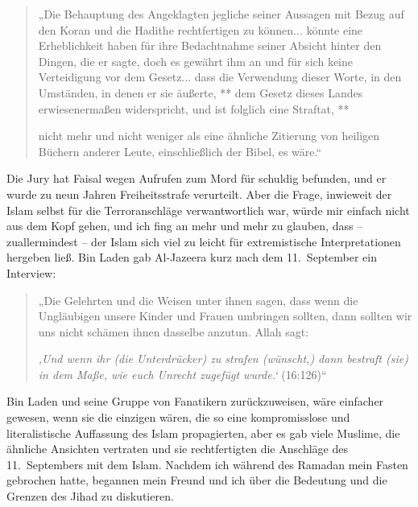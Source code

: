 \documentclass[12pt]{memoir}
\newcommand{\QRef}[1]{{\color{darkblue}#1}}
\begin{document}
\begin{quote}
„Die Behauptung des Angeklagten
jegliche seiner Aussagen mit Bezug auf den Koran
und die Hadithe rechtfertigen zu können...
könnte eine Erheblichkeit haben für ihre Bedachtnahme
seiner Absicht hinter den Dingen, die er sagte,
doch es gewährt ihm an und für sich keine Verteidigung vor dem Gesetz...
dass die Verwendung dieser Worte,
in den Umständen, in denen er sie äußerte,
**
dem Gesetz dieses Landes erwiesenermaßen widerspricht,
und ist folglich eine Straftat,
**

nicht mehr und nicht weniger als eine ähnliche Zitierung
von heiligen Büchern anderer Leute, einschließlich der Bibel, es wäre.“
\end{quote}

Die Jury hat Faisal wegen Aufrufen zum Mord für schuldig befunden,
und er wurde zu neun Jahren Freiheitsstrafe verurteilt.
Aber die Frage, inwieweit der Islam selbst
für die Terroranschläge verwantwortlich war,
würde mir einfach nicht aus dem Kopf gehen,
und ich fing an mehr und mehr zu glauben,
dass – zuallermindest – der Islam sich viel zu leicht
für extremistische Interpretationen hergeben ließ.
Bin Laden gab Al-Jazeera kurz nach dem 11.\ September ein Interview:

\begin{quote}
„Die Gelehrten und die Weisen unter ihnen sagen,
dass wenn die Ungläubigen unsere Kinder und Frauen umbringen sollten,
dann sollten wir uns nicht schämen ihnen dasselbe anzutun.
Allah sagt:

\emph{‚Und wenn ihr (die Unterdrücker) zu strafen (wünscht,)
dann bestraft (sie) in dem Maße, wie euch Unrecht zugefügt wurde.‘}
(\QRef{16:126})“
\end{quote}

Bin Laden und seine Gruppe von Fanatikern zurückzuweisen,
wäre einfacher gewesen, wenn sie die einzigen wären,
die so eine kompromisslose und literalistische Auffassung
des Islam propagierten,
aber es gab viele Muslime, die ähnliche Ansichten vertraten und
sie rechtfertigten die Anschläge des 11.\ Septembers mit dem Islam.
Nachdem ich während des Ramadan mein Fasten gebrochen hatte,
begannen mein Freund und ich über die Bedeutung
und die Grenzen des Jihad zu diskutieren.
\end{document}
